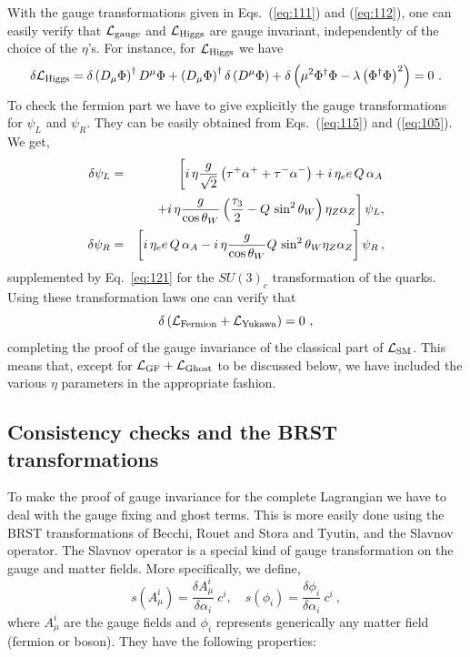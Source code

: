\documentclass{ws-ijmpa}
\begin{document}
With the gauge transformations given in Eqs.~(\ref{eq:111}) and
(\ref{eq:112}),
one can easily verify that $\mathcal{L}_{\rm gauge}$
and  $\mathcal{L}_{\rm Higgs}$ are gauge
invariant, independently of the choice of the $\eta$'s.
For instance,
for $\mathcal{L}_{\rm Higgs}$ we have 
%
\begin{equation}
  \label{eq:3}
  \delta \mathcal{L}_{\rm Higgs} = \delta \left(D_\mu
    \Phi\right)^\dagger D^\mu \Phi + \left(D_\mu
    \Phi\right)^\dagger \delta \left(D^\mu \Phi\right)
+ \delta \left( \mu^2 \Phi^\dagger \Phi - \lambda \left(\Phi^\dagger \Phi
\right)^2 \right)
 = 0 \ .
\end{equation}
%
To check the fermion part we have to give explicitly the gauge
transformations for $\psi_L$ and $\psi_R$.
They can be easily obtained
from Eqs.~(\ref{eq:115}) and (\ref{eq:105}).
We get,
%
\begin{eqnarray}
\delta \psi_L
&=&
\left[   i\, \eta \frac{g}{\sqrt{2}} \left(
 \tau^+ \alpha^+  +  \tau^- \alpha^- \right) +i\, \eta_e e\, Q\,   \alpha_A
\right.
\nonumber\\
&&
\left.
\hspace{5mm}
+ i\, \eta \frac{g}{\cos\theta_W} \left(\frac{\tau_3}{2} - Q\, \sin^2\theta_W
\right) \eta_Z \alpha_Z \right] \psi_L ,
\nonumber\\
\delta \psi_R
&=&
\left[ i\, \eta_e  e\, Q\,   \alpha_A
- i\, \eta \frac{ g}{\cos\theta_W}  Q\, \sin^2\theta_W 
\eta_Z \alpha_Z \right] \psi_R\, ,
\label{eq:5}
\end{eqnarray}
%
supplemented by Eq.~\eqref{eq:121} for the $SU(3)_c$
transformation of the quarks.
Using these transformation laws one can verify that
%
\begin{equation}
  \label{eq:6}
\delta \left( \mathcal{L}_{\rm Fermion} + \mathcal{L}_{\rm
    Yukawa}\right) =0\ ,
\end{equation}
%
completing the proof of the gauge invariance of the classical part of 
$\mathcal{L}_{\rm SM}$.
This means that,
except for $\mathcal{L}_{\rm GF} + \mathcal{L}_{\rm Ghost}$
to be discussed below,
we have included the various
$\eta$ parameters in the appropriate fashion.


\subsection{Consistency checks and the BRST transformations}

To make the proof of gauge invariance for the complete Lagrangian
we have to deal with
the gauge fixing and ghost terms. This is more easily done using the
BRST transformations of Becchi, Rouet and Stora\cite{becchi:1975nq} and
Tyutin\cite{tyutin:1975qk},
and the Slavnov operator.
The Slavnov operator is a special kind of gauge transformation
on the gauge and matter fields.
More specifically,
we define,
%
\begin{equation}
  \label{eq:7}
  s(A_\mu^i) = \frac{\delta A_\mu^i}{\delta \alpha_i} \ c^i, \quad
  s(\phi_i) = \frac{\delta \phi_i}{\delta \alpha_i} \ c^i\ ,
\end{equation}
%
where $A_\mu^i$ are the gauge fields and $\phi_i$ represents
generically any matter field (fermion or boson). They have the
following properties:
%
\end{document}
